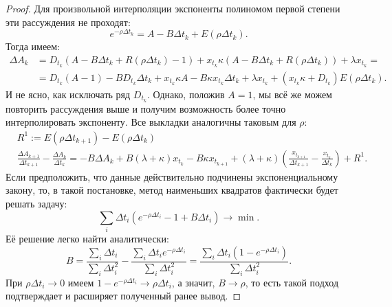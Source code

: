 \begin{appendices}
\begin{proof}
        Для произвольной интерполяции экспоненты полиномом первой степени эти рассуждения не проходят:
        \begin{equation*}
                e^{- \rho \Delta t_k} = A - B \Delta t_k + E (\rho \Delta t_k).
        \end{equation*}
        Тогда имеем:
        \begin{align*}
                \Delta A_k &= D_{t_k} (A - B \Delta t_k + R (\rho \Delta t_k) - 1) + 
                x_{t_k} \kappa (A - B \Delta t_k + R (\rho \Delta t_k)) + \lambda x_{t_k} =\\
                &= D_{t_k} (A - 1) - B D_{t_k} \Delta t_k + x_{t_k} \kappa A 
                - B \kappa x_{t_k} \Delta t_k + \lambda x_{t_k} + (x_{t_k} \kappa + D_{t_k}) E (\rho \Delta t_k).
        \end{align*}
        И не ясно, как исключать ряд $D_{t_k}$. Однако, положив $A = 1$, мы всё же можем повторить рассуждения выше и получим возможность
        более точно интерполировать экспоненту. Все выкладки аналогичны таковым для $\rho$:
        \begin{align*}
                & R^1 := E (\rho \Delta t_{k+1}) - E (\rho \Delta t_k) \\
                & \frac{\Delta A_{k+1}}{\Delta t_{k+1}} - \frac{\Delta A_{k}}{\Delta t_{k}} = 
                -B \Delta A_k + B (\lambda + \kappa) x_{t_k} - B \kappa x_{t_{k+1}} 
                + (\lambda + \kappa) \left(\frac{x_{t_{k+1}}}{\Delta t_{k+1}} - \frac{x_{t_k}}{\Delta t_{k}}\right) + R^1.
        \end{align*} 
        Если предположить, что данные действительно подчинены экспоненциальному закону, то, в такой постановке, метод наименьших 
        квадратов фактически будет решать задачу:
        \begin{equation*}
                \sum _{i} \Delta t_i \left(e^{- \rho \Delta t_i} - 1 + B \Delta t_i \right) \rightarrow \min.
        \end{equation*} 
        Её решение легко найти аналитически:
        \begin{equation*}
                B = \frac{\sum _{i} \Delta t_i}{\sum _{i} \Delta t_i^2} - \frac{\sum _{i} \Delta t_i e^{-\rho \Delta t_i}}{\sum _{i} \Delta t_i^2} 
                = \frac{\sum _{i} \Delta t_i ( 1 - e^{-\rho \Delta t_i})}{\sum _{i} \Delta t_i^2}.
        \end{equation*} 
        При $\rho \Delta t_i \rightarrow 0$ имеем $1 - e^{-\rho \Delta t_i} \rightarrow \rho \Delta t_i$, 
        а значит, $B \rightarrow \rho$, то есть такой подход подтверждает и расширяет полученный ранее вывод. 

\end{proof}
\end{appendices}

